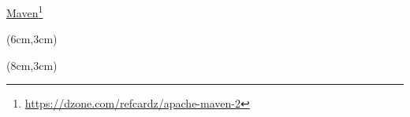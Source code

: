 \documentclass[English,c,%
hyperref={%
    pdftitle={FISA-DE2 OOP in Java},%
    pdfauthor={Muller, Gravier, Laforest, Subercaze},%
    pdfsubject={OOP in Java},%
    pdfkeywords={OOP, Java},%
    colorlinks=true,%
    urlcolor=blue,%
    linkcolor=%
    },%
xcolor={pdftex,svgnames} %
]{beamer}
\begin{document}
\begin{frame}[fragile]{\href{https://maven.apache.org/}{\color{white} Maven}\footnote{\url{https://dzone.com/refcardz/apache-maven-2}}}
  \begin{textblock*}{0.4\linewidth}(6cm,3cm)%
  \end{textblock*}
  \begin{textblock*}{0.4\linewidth}(8cm,3cm)%
  \end{textblock*}

\end{frame}
\end{document}
